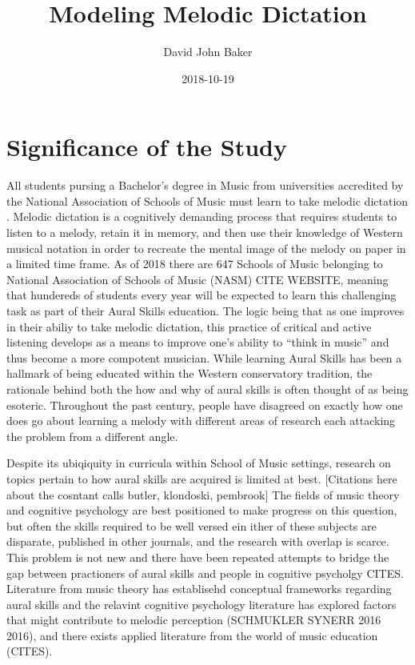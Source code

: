 \documentclass[]{book}
\title{Modeling Melodic Dictation}
\author{David John Baker}
\date{2018-10-19}
\theoremstyle{definition}
\theoremstyle{definition}
\theoremstyle{definition}
\theoremstyle{remark}
\begin{document}
\maketitle

{
\setcounter{tocdepth}{1}
\tableofcontents
}
\hypertarget{significance-of-the-study}{%
\chapter{Significance of the Study}\label{significance-of-the-study}}

All students pursing a Bachelor's degree in Music from universities
accredited by the National Association of Schools of Music must learn to
take melodic dictation \citep[ Section
VIII.6.B.2.A]{NationalAssociationSchools2018}. Melodic dictation is a
cognitively demanding process that requires students to listen to a
melody, retain it in memory, and then use their knowledge of Western
musical notation in order to recreate the mental image of the melody on
paper in a limited time frame. As of 2018 there are 647 Schools of Music
belonging to National Association of Schools of Music (NASM) CITE
WEBSITE, meaning that hundereds of students every year will be expected
to learn this challenging task as part of their Aural Skills education.
The logic being that as one improves in their abiliy to take melodic
dictation, this practice of critical and active listening develops as a
means to improve one's ability to ``think in music'' and thus become a
more compotent musician. While learning Aural Skills has been a hallmark
of being educated within the Western conservatory tradition, the
rationale behind both the how and why of aural skills is often thought
of as being esoteric. Throughout the past century, people have disagreed
on exactly how one does go about learning a melody with different areas
of research each attacking the problem from a different angle.

Despite its ubiqiquity in curricula within School of Music settings,
research on topics pertain to how aural skills are acquired is limited
at best. {[}Citations here about the cosntant calls butler, klondoski,
pembrook{]} The fields of music theory and cognitive psychology are best
positioned to make progress on this question, but often the skills
required to be well versed ein ither of these subjects are disparate,
published in other journals, and the research with overlap is scarce.
This problem is not new and there have been repeated attempts to bridge
the gap between practioners of aural skills and people in cognitive
psycholgy CITES. Literature from music theory has establisehd conceptual
frameworks regarding aural skills
\citet{karpinskiAuralSkillsAcquisition2000} and the relavint cognitive
psychology literature has explored factors that might contribute to
melodic perception (SCHMUKLER SYNERR 2016 2016), and there exists
applied literature from the world of music education (CITES).
\end{document}
